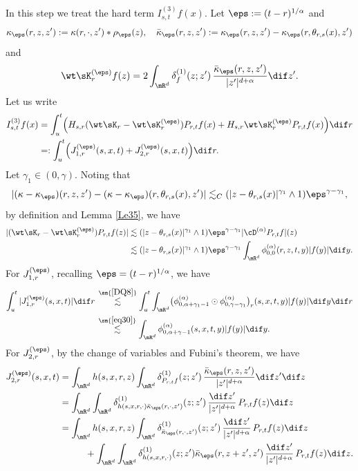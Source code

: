 \step\label{Step 3}
In this step we treat the hard term $I^{(3)}_{s,t} f(x)$. Let $\eps:=(t-r)^{1/\alpha}$ and
\[
\kappa_\eps(r,z,z'):=\kappa(r,\cdot,z')*\rho_\eps(z),\quad \bar\kappa_\eps(r,z,z'):=\kappa_\eps(r,z,z')-\kappa_\eps(r,\theta_{r,s}(x),z')
\]
and
\[
\wt\sK^{(\eps)}_rf(z)=2\int_{\mR^d}\delta^{(1)}_f(z;z')\,\frac{\bar\kappa_\eps(r,z,z')}{|z'|^{d+\alpha}}\dif z'.
\]
Let us write
\begin{align*}
I^{(3)}_{s,t} f(x)&=\int^t_{u}\Bigl(H_{s,r}(\wt\sK_r-\wt\sK^{(\eps)}_r)P_{r,t}f(x)
+H_{s,r}\wt\sK^{(\eps)}_r P_{r,t}f(x)\Bigr)\dif r\\
&=:\int^t_{u}\Bigl(J^{(\eps)}_{1,r}(s,x,t)+J^{(\eps)}_{2,r}(s,x,t)\Bigr)\dif r.
\end{align*}
Let $\gamma_1\in(0,\gamma)$. Noting that
\[
|(\kappa-\kappa_\eps)(r,z,z')-(\kappa-\kappa_\eps)(r,\theta_{r,s}(x),z')|\lesssim_C(|z-\theta_{r,s}(x)|^{\gamma_1}\wedge 1)\eps^{\gamma-\gamma_1},
\]
by definition and Lemma \ref{Le35}, we have
\begin{align*}
|(\wt\sK_r-\wt\sK^{(\eps)}_r)P_{r,t}f(z)|&\lesssim
(|z-\theta_{r,s}(x)|^{\gamma_1}\wedge 1)\eps^{\gamma-\gamma_1}|\cD^{(\alpha)}P_{r,t}f|(z)\\
&\lesssim (|z-\theta_{r,s}(x)|^{\gamma_1}\wedge 1)\eps^{\gamma-\gamma_1}\int_{\mR^d}\phi^{(\alpha)}_{0,0}(r,z,t,y)|f(y)|\dif y.
\end{align*}
For $J^{(\eps)}_{1,r}$, recalling $\eps=(t-r)^{1/\alpha}$, we have
\begin{align*}
\int_{u}^t |J^{(\eps)}_{1,r}(s,x,t)|\dif r
&\,\stackrel{\sm{\eqref{DQ8}}}{\lesssim}\int^t_{u}\int_{\mR^d}\bigl(\phi^{(\alpha)}_{0,\alpha+\gamma_1-1}\odot
\phi^{(\alpha)}_{0,\gamma-\gamma_1}\bigr)_r(s,x,t,y)|f(y)|\dif y\dif r\\
&\,\stackrel{\sm{\eqref{eq30}}}{\lesssim}\int_{\mR^d}\phi^{(\alpha)}_{0,\alpha+\gamma-1}(s,x,t,y)|f(y)|\dif y.
\end{align*}
For $J^{(\eps)}_{2,r}$, by the change of variables and Fubini's theorem, we have
\begin{align*}
J^{(\eps)}_{2,r}(s,x,t)&=\int_{\mR^d}h(s,x,r,z)\int_{\mR^d}\delta^{(1)}_{P_{r,t}f}(z;z')\,\frac{\bar\kappa_\eps(r,z,z')}{|z'|^{d+\alpha}}\dif z'\dif z\\
&=\int_{\mR^d}\int_{\mR^d}\delta^{(1)}_{h(s,x,r,\cdot)\bar\kappa_\eps(r,\cdot,z')}(z;z')\,\frac{\dif z'}{|z'|^{d+\alpha}}\,P_{r,t}f(z)\dif z\\
&=\int_{\mR^d}h(s,x,r,z)\int_{\mR^d}\delta^{(1)}_{\bar\kappa_\eps(r,\cdot,z')}(z;z')\,\frac{\dif z'}{|z'|^{d+\alpha}}\,P_{r,t}f(z)\dif z\\
&\hspace*{1cm}+\int_{\mR^d}\int_{\mR^d}\delta^{(1)}_{h(s,x,r,\cdot)}(z;z')\bar\kappa_\eps(r,z+z',z')\,\frac{\dif z'}{|z'|^{d+\alpha}}\,P_{r,t}f(z)\dif z.
\end{align*}
